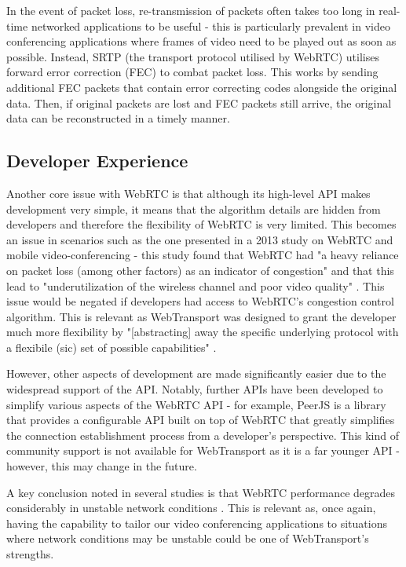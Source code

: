 In the event of packet loss, re-transmission of packets often takes too long in real-time networked applications to be useful - this is particularly prevalent in video conferencing applications where frames of video need to be played out as soon as possible. Instead, SRTP (the transport protocol utilised by WebRTC) utilises forward error correction (FEC) to combat packet loss. This works by sending additional FEC packets that contain error correcting codes alongside the original data. Then, if original packets are lost and FEC packets still arrive, the original data can be reconstructed in a timely manner. 

\subsection{Developer Experience}

Another core issue with WebRTC is that although its high-level API makes development very simple, it means that the algorithm details are hidden from developers and therefore the flexibility of WebRTC is very limited. This becomes an issue in scenarios such as the one presented in a 2013 study on WebRTC and mobile video-conferencing - this study found that WebRTC had "a heavy reliance on packet loss (among other factors) as an indicator of congestion" and that this lead to "underutilization of the wireless channel and poor video quality" \cite{fund2013}. This issue would be negated if developers had access to WebRTC's congestion control algorithm. This is relevant as WebTransport was designed to grant the developer much more flexibility by "[abstracting] away the specific underlying protocol with a flexibile (sic) set of possible capabilities" \cite{wtexplainer}.

However, other aspects of development are made significantly easier due to the widespread support of the API. Notably, further APIs have been developed to simplify various aspects of the WebRTC API - for example, PeerJS is a library that provides a configurable API built on top of WebRTC that greatly simplifies the connection establishment process from a developer's perspective. This kind of community support is not available for WebTransport as it is a far younger API - however, this may change in the future.

A key conclusion noted in several studies is that WebRTC performance degrades considerably in unstable network conditions \cite{moulay2018} \cite{jansen2018} \cite{fund2013}. This is relevant as, once again, having the capability to tailor our video conferencing applications to situations where network conditions may be unstable could be one of WebTransport's strengths.

